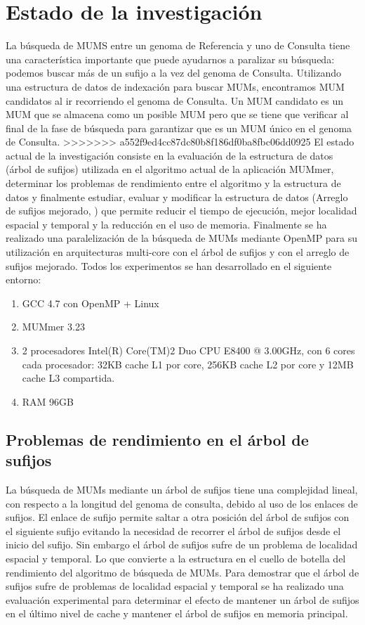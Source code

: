 \documentclass[12pt,a4paper]{article}
\begin{document}
\section{Estado de la investigación}
La búsqueda de MUMS entre un genoma de Referencia y uno de Consulta tiene una característica importante que puede ayudarnos a paralizar su búsqueda: podemos buscar más de un sufijo a la vez del genoma de Consulta. Utilizando una estructura de datos de indexación para buscar MUMs, encontramos MUM candidatos al ir recorriendo el genoma de Consulta. Un MUM candidato es un MUM que se almacena como un posible MUM pero que se tiene que verificar al final de la fase de búsqueda para garantizar que es un MUM único en el genoma de Consulta.
>>>>>>> a552f9ed4cc87dc80b8f186df0ba8fbc06dd0925
El estado actual de la investigación consiste en la evaluación de la estructura de datos (árbol de sufijos) utilizada en el algoritmo actual de la aplicación MUMmer, determinar los problemas de rendimiento entre el algoritmo y la estructura de datos y finalmente estudiar, evaluar y modificar la estructura de datos (Arreglo de sufijos mejorado, \cite{Abouelhoda2004}) que permite reducir el tiempo de ejecución, mejor localidad espacial y temporal y la reducción en el uso de memoria.
Finalmente se ha realizado una paralelización de la búsqueda de MUMs mediante OpenMP para su utilización en arquitecturas multi-core con el árbol de sufijos y con el arreglo de sufijos mejorado.
Todos los experimentos se han desarrollado en el siguiente entorno:
\begin{enumerate}
\item GCC 4.7 con OpenMP + Linux
\item MUMmer 3.23
\item 2 procesadores Intel(R) Core(TM)2 Duo CPU     E8400  @ 3.00GHz, con 6 cores cada procesador: 32KB cache L1 por core, 256KB cache L2 por core y 12MB cache L3 compartida.
\item RAM 96GB
\end{enumerate}
\subsection{Problemas de rendimiento en el árbol de sufijos}
La búsqueda de MUMs mediante un árbol de sufijos tiene una complejidad lineal, con respecto a la longitud del genoma de consulta, debido al uso de los enlaces de sufijos. El enlace de sufijo permite saltar a otra posición del árbol de sufijos con el siguiente sufijo evitando la necesidad de recorrer el árbol de sufijos desde el inicio del sufijo. 
Sin embargo el árbol de sufijos sufre de un problema de localidad espacial y temporal. Lo que convierte a la estructura en el cuello de botella del rendimiento del algoritmo de búsqueda de MUMs.
Para demostrar que el árbol de sufijos sufre de problemas de localidad espacial y temporal se ha realizado una evaluación experimental para determinar el efecto de mantener un árbol de sufijos en el último nivel de cache y mantener el árbol de sufijos en memoria principal.
\end{document}
